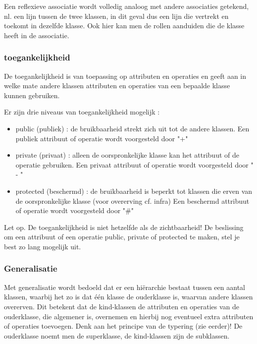 Een reflexieve associatie wordt volledig analoog met andere associaties getekend, nl. een lijn tussen de twee klassen, in dit geval dus een lijn die vertrekt en toekomt in dezelfde klasse. Ook hier kan men de rollen aanduiden die de klasse heeft in de associatie.

\subsubsection{toegankelijkheid}

De toegankelijkheid is van toepassing op attributen en operaties en geeft aan in welke mate andere klassen attributen en operaties van een bepaalde klasse kunnen gebruiken.

Er zijn drie niveaus van toegankelijkheid mogelijk :

\begin{itemize}
    \item public (publiek) :
de bruikbaarheid strekt zich uit tot de andere klassen.
Een publiek attribuut of operatie wordt voorgesteld door "+"
    \item private (privaat) :
alleen de oorspronkelijke klasse kan het attribuut of de operatie gebruiken.
Een privaat attribuut of operatie wordt voorgesteld door " - "
    \item protected (beschermd) :
de bruikbaarheid is beperkt tot klassen die erven van de oorspronkelijke klasse (voor overerving cf. infra)
Een beschermd attribuut of operatie wordt voorgesteld door "\#"
\end{itemize}

Let op. De toegankelijkheid is niet hetzelfde als de zichtbaarheid!
De beslissing om een attribuut of een operatie public, private of protected te maken, stel je best zo lang mogelijk uit.

\subsubsection{Generalisatie}

Met generalisatie wordt bedoeld dat er een hiërarchie bestaat tussen een aantal klassen, waarbij het zo is dat één klasse de ouderklasse is, waarvan andere klassen overerven. Dit betekent dat de kind-klassen de attributen en operaties van de ouderklasse, die algemener is, overnemen en hierbij nog eventueel extra attributen of operaties toevoegen. Denk aan het principe van de typering (zie eerder)! De ouderklasse noemt men de superklasse, de kind-klassen zijn de subklassen.

